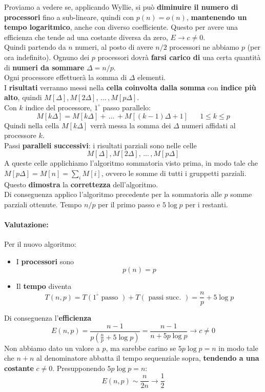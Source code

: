 \documentclass[11pt]{article}
\begin{document}
	\newpage
	
	Proviamo a vedere se, applicando Wyllie, si può \textbf{diminuire il numero di processori} fino a sub-lineare, quindi con $p(n) = o(n)$, \textbf{mantenendo un tempo logaritmico}, anche con diverso coefficiente. Questo per avere una efficienza che tende ad una costante diversa da zero, $E \rightarrow c \neq 0$. \\
	
	Quindi partendo da $n$ numeri, al posto di avere $n/2$ processori ne abbiamo $p$ (per ora indefinito). Ognuno dei $p$ processori dovrà \textbf{farsi carico di} una certa quantità di \textbf{numeri da sommare} $\Delta = n/p$.\\
	Ogni processore effettuerà la somma di $\Delta$ elementi. \\
	
	I \textbf{risultati} verranno messi nella \textbf{cella coinvolta dalla somma} con \textbf{indice più alto}, quindi $M[\Delta], M[2 \Delta], \, ... \, , M[p \Delta]$.\\
	
	Con $k$ indice del processore, $1^\circ$ passo parallelo:
	$$ M[k \Delta] = M[k \Delta] + \, ... \, + M[(k-1) \Delta + 1] \;\;\;\;\;\; 1 \leq k \leq p $$
	Quindi nella cella $M[k \Delta]$ verrà messa la somma dei $\Delta$ numeri affidati al processore $k$.\\
	
	Passi \textbf{paralleli successivi}: i risultati parziali sono nelle celle
	$$ M[\Delta], M[2\Delta], \, ... \, , M[p \Delta] $$
	A queste celle applichiamo l'algoritmo sommatoria visto prima, in modo tale che $ M[p \Delta] = M[n] = \sum_i M[i] $, ovvero le somme di tutti i gruppetti parziali.\\
	Questo \textbf{dimostra} la \textbf{correttezza} dell'algoritmo.\\
	
	Di conseguenza applico l'algoritmo precedente per la sommatoria alle $p$ somme parziali ottenute. Tempo $n/p$ per il primo passo e $5 \log p$ per i restanti.\\
	
	\newpage
	
	\paragraph{Valutazione:} Per il nuovo algoritmo:
	\begin{itemize}
		\item I \textbf{processori} sono
		$$p (n) = p $$
		
		\item Il \textbf{tempo} diventa 
		$$T (n,p) = T(1^\circ \text{ passo }) + T(\text{ passi succ. }) = \frac{n}{p} + 5 \log p$$
	\end{itemize}
	Di conseguenza l'\textbf{efficienza}
	$$ E (n,p) = \frac{n-1}{p\left(\frac{n}{p} + 5 \log p \right)} = \frac{n-1}{n + 5p \log p} \rightarrow c \neq 0 $$
	Non abbiamo dato un valore a $p$, ma sarebbe carino se $5p \log p = n$ in modo tale che $n+n$ al denominatore abbatta il tempo sequenziale sopra, \textbf{tendendo a una costante} $c \neq 0$. Presupponendo $5p \log p = n$:
	$$ E (n,p) \sim \frac{n}{2n} \rightarrow \frac{1}{2} $$
	
\end{document}
